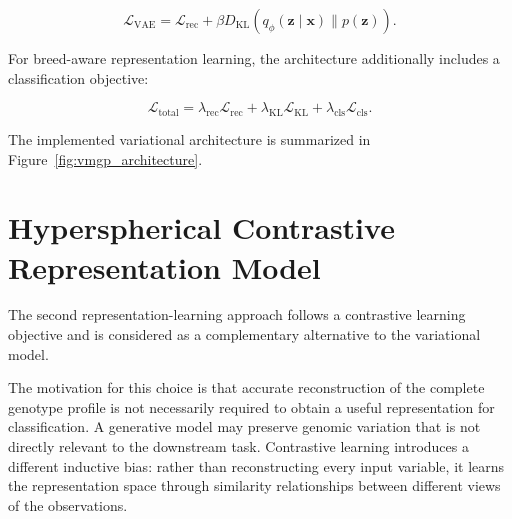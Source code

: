 \begin{equation}
    \mathcal{L}_{\mathrm{VAE}}
    =
    \mathcal{L}_{\mathrm{rec}}
    +
    \beta
    D_{\mathrm{KL}}
    \left(
        q_{\phi}
        (
            \mathbf{z}
            \mid
            \mathbf{x}
        )
        \parallel
        p(\mathbf{z})
    \right).
    \label{eq:vae_loss}
\end{equation}

For breed-aware representation learning, the architecture additionally
includes a classification objective:

\begin{equation}
    \mathcal{L}_{\mathrm{total}}
    =
    \lambda_{\mathrm{rec}}
    \mathcal{L}_{\mathrm{rec}}
    +
    \lambda_{\mathrm{KL}}
    \mathcal{L}_{\mathrm{KL}}
    +
    \lambda_{\mathrm{cls}}
    \mathcal{L}_{\mathrm{cls}}.
    \label{eq:vmgp_total_loss}
\end{equation}

%
%





The implemented variational architecture is summarized in
Figure~\ref{fig:vmgp_architecture}.




\section{Hyperspherical Contrastive Representation Model}
\label{sec:contrastive_model}

The second representation-learning approach follows a contrastive
learning objective \cite{oord2018representation,chen2020simple} and
is considered as a complementary alternative to the variational model.

The motivation for this choice is that accurate reconstruction of the
complete genotype profile is not necessarily required to obtain a
useful representation for classification. A generative model may
preserve genomic variation that is not directly relevant to the
downstream task. Contrastive learning introduces a different
inductive bias: rather than reconstructing every input variable, it
learns the representation space through similarity relationships
between different views of the observations.

